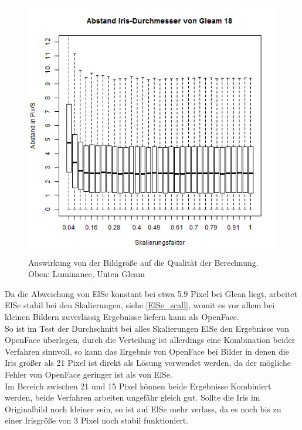 \begin{figure}
	\includegraphics[width=0.32\linewidth]{Eye_Img_Box/Gleam_Radius_I_18}
	\caption{Auswirkung von der Bildgröße auf die Qualität der Berechnung.\\ Oben: Luminance, Unten Gleam}
	\label{ElSe_scall}
\end{figure}
Da die Abweichung von ElSe konstant bei etwa 5.9 Pixel bei Glean liegt, arbeitet ElSe stabil bei den Skalierungen, siehe \autoref{ElSe_scall}, womit es vor allem bei kleinen Bildern zuverlässig Ergebnisse liefern kann als OpenFace.\\
So ist im Test der Durchschnitt bei alles Skalierungen ElSe den Ergebnisse von OpenFace überlegen, durch die Verteilung ist allerdings eine Kombination beider Verfahren sinnvoll, so kann das Ergebnis von OpenFace bei Bilder in denen die Iris größer als 21 Pixel ist direkt als Lösung verwendet werden, da der mögliche Fehler von OpenFace geringer ist als von ElSe.\\
Im Bereich zwischen 21 und 15 Pixel können beide Ergebnisse Kombiniert werden, beide Verfahren arbeiten ungefähr gleich gut. Sollte die Iris im Originalbild noch kleiner sein, so ist auf ElSe mehr verlass, da es noch bis zu einer Irisgröße von 3 Pixel noch stabil funktioniert.
